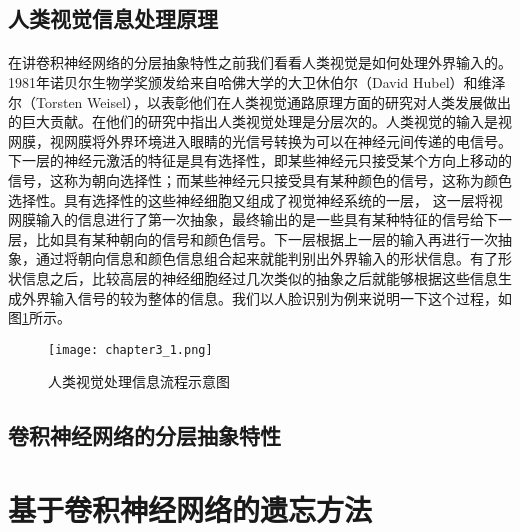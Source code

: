 \subsection{人类视觉信息处理原理}
\paragraph{}在讲卷积神经网络的分层抽象特性之前我们看看人类视觉是如何处理外界输入的。1981年诺贝尔生物学奖颁发给来自哈佛大学的大卫休伯尔（David Hubel）和维泽尔（Torsten Weisel），以表彰他们在人类视觉通路原理方面的研究对人类发展做出的巨大贡献。在他们的研究中指出人类视觉处理是分层次的。人类视觉的输入是视网膜，视网膜将外界环境进入眼睛的光信号转换为可以在神经元间传递的电信号。下一层的神经元激活的特征是具有选择性，即某些神经元只接受某个方向上移动的信号，这称为朝向选择性；而某些神经元只接受具有某种颜色的信号，这称为颜色选择性。具有选择性的这些神经细胞又组成了视觉神经系统的一层， 这一层将视网膜输入的信息进行了第一次抽象，最终输出的是一些具有某种特征的信号给下一层，比如具有某种朝向的信号和颜色信号。下一层根据上一层的输入再进行一次抽象，通过将朝向信息和颜色信息组合起来就能判别出外界输入的形状信息。有了形状信息之后，比较高层的神经细胞经过几次类似的抽象之后就能够根据这些信息生成外界输入信号的较为整体的信息。我们以人脸识别为例来说明一下这个过程，如图\ref{fig:chapter3_1}所示。
\begin{figure}
    \centering
    \texttt{[image: chapter3\_1.png]}
    \caption{人类视觉处理信息流程示意图}
    \label{fig:chapter3_1}
\end{figure}

\subsection{卷积神经网络的分层抽象特性}

\section{基于卷积神经网络的遗忘方法}
